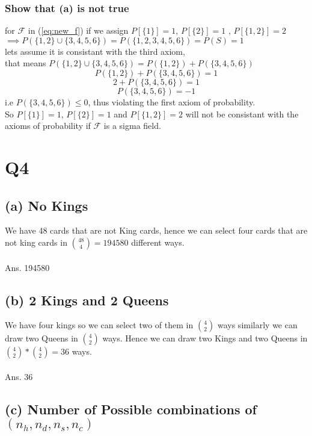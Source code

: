 \documentclass[a4paper,11pt]{article}
\begin{document}
\subsubsection*{Show that (a) is not true}
for $\mathcal{F}$ in (\ref{eq:new_f}) if we assign  $P[\{1\}]=1$, $P[\{2\}]=1$ , $P[\{1,2\}]=2$\\
$\implies P(\{1,2\} \cup \{3,4,5,6\})= P(\{1,2,3,4,5,6\})=P(S)=1$ \\
lets assume  it is consistant with the third axiom,\\ that means $P(\{1,2\} \cup \{3,4,5,6\}) =  P(\{1,2\})+P(\{3,4,5,6\})$\\
 $$P(\{1,2\})+P(\{3,4,5,6\}) = 1$$
 $$2+ P(\{3,4,5,6\}) = 1 $$
 $$ P(\{3,4,5,6\}) = -1 $$
 i.e $P(\{3,4,5,6\}) \le 0$, thus violating the first axiom of probability.\\
 So $P[\{1\}]=1$, $P[\{2\}]=1$ and $P[\{1,2\}]=2$ will not be consistant with the  axioms of probability if $\mathcal{F}$ is a sigma field.
 
\newpage
\section*{Q4}
\subsection*{(a) No Kings}
We have 48 cards that are not King cards, hence we can select four cards that are not king cards in ${48 \choose 4} = 194580 $  different ways. \\\\
Ans. 194580
\subsection*{(b) 2 Kings and 2 Queens}
We have four kings so we can select two of them in ${ 4 \choose 2}$ ways similarly we can draw two Queens in  ${ 4 \choose 2}$ ways. Hence we can draw two Kings and two Queens in ${ 4 \choose 2}*{ 4 \choose 2}=36$ ways.\\\\
Ans. 36

\subsection*{(c) Number of Possible combinations of $(n_h,n_d,n_s,n_c)$}

\newpage
\end{document}
